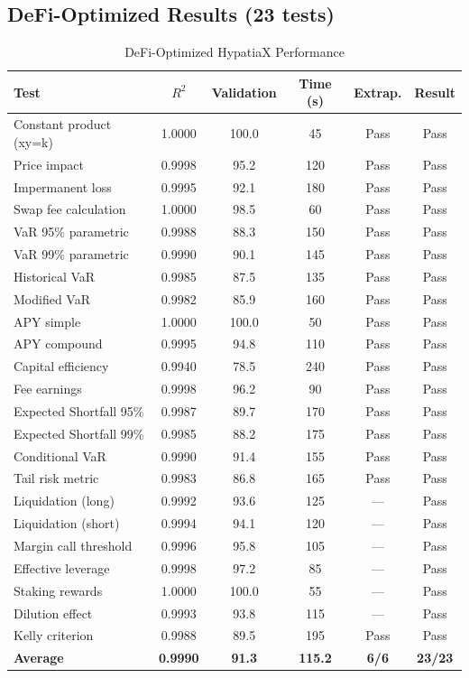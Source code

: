 \documentclass[twoside,11pt]{article}
\begin{document}
\subsection{DeFi-Optimized Results (23 tests)}

\begin{table}[H]
\centering
\caption{DeFi-Optimized HypatiaX Performance}
\label{tab:defi_detailed}
\begin{small}
\begin{tabular}{@{}lccccc@{}}
\toprule
\textbf{Test} & \textbf{$R^2$} & \textbf{Validation} & \textbf{Time (s)} & \textbf{Extrap.} & \textbf{Result} \\
\midrule
Constant product (xy=k) & 1.0000 & 100.0 & 45 & Pass & Pass \\
Price impact & 0.9998 & 95.2 & 120 & Pass & Pass \\
Impermanent loss & 0.9995 & 92.1 & 180 & Pass & Pass \\
Swap fee calculation & 1.0000 & 98.5 & 60 & Pass & Pass \\
VaR 95\% parametric & 0.9988 & 88.3 & 150 & Pass & Pass \\
VaR 99\% parametric & 0.9990 & 90.1 & 145 & Pass & Pass \\
Historical VaR & 0.9985 & 87.5 & 135 & Pass & Pass \\
Modified VaR & 0.9982 & 85.9 & 160 & Pass & Pass \\
APY simple & 1.0000 & 100.0 & 50 & Pass & Pass \\
APY compound & 0.9995 & 94.8 & 110 & Pass & Pass \\
Capital efficiency & 0.9940 & 78.5 & 240 & Pass & Pass \\
Fee earnings & 0.9998 & 96.2 & 90 & Pass & Pass \\
Expected Shortfall 95\% & 0.9987 & 89.7 & 170 & Pass & Pass \\
Expected Shortfall 99\% & 0.9985 & 88.2 & 175 & Pass & Pass \\
Conditional VaR & 0.9990 & 91.4 & 155 & Pass & Pass \\
Tail risk metric & 0.9983 & 86.8 & 165 & Pass & Pass \\
Liquidation (long) & 0.9992 & 93.6 & 125 & --- & Pass \\
Liquidation (short) & 0.9994 & 94.1 & 120 & --- & Pass \\
Margin call threshold & 0.9996 & 95.8 & 105 & --- & Pass \\
Effective leverage & 0.9998 & 97.2 & 85 & --- & Pass \\
Staking rewards & 1.0000 & 100.0 & 55 & --- & Pass \\
Dilution effect & 0.9993 & 93.8 & 115 & --- & Pass \\
Kelly criterion & 0.9988 & 89.5 & 195 & Pass & Pass \\
\midrule
\textbf{Average} & \textbf{0.9990} & \textbf{91.3} & \textbf{115.2} & \textbf{6/6} & \textbf{23/23} \\
\bottomrule
\end{tabular}
\end{small}
\end{table}
\end{document}
